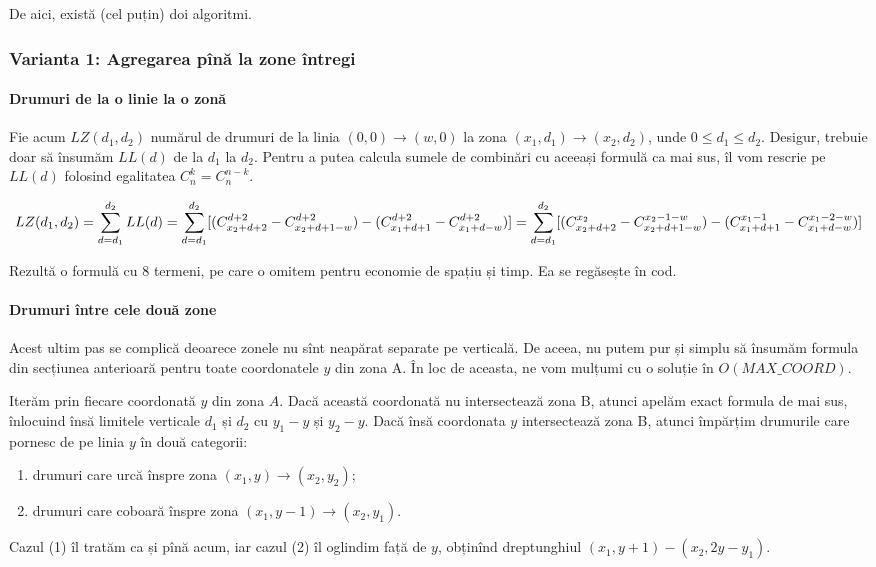 \documentclass[../main.tex]{subfiles}
\begin{document}
De aici, există (cel puțin) doi algoritmi.

\subsubsection*{Varianta 1: Agregarea pînă la zone întregi}

\paragraph*{Drumuri de la o linie la o zonă}

Fie acum $LZ(d_1, d_2)$ numărul de drumuri de la linia $(0,0) \to (w, 0)$ la zona $(x_1, d_1) \to (x_2, d_2)$, unde $0 \leq d_1 \leq d_2$. Desigur, trebuie doar să însumăm $LL(d)$ de la $d_1$ la $d_2$. Pentru a putea calcula sumele de combinări cu aceeași formulă ca mai sus, îl vom rescrie pe $LL(d)$ folosind egalitatea $C_n^k = C_n^{n-k}$.

$$
LZ(d_1, d_2) = \sum_{d = d_1}^{d_2} LL(d)\\
= \sum_{d = d_1}^{d_2} [(C_{x_2 + d + 2}^{d + 2} - C_{x_2 + d + 1 - w}^{d + 2}) - (C_{x_1 + d + 1}^{d + 2} - C_{x_1 + d - w}^{d + 2})]\\
= \sum_{d = d_1}^{d_2} [(C_{x_2 + d + 2}^{x_2} - C_{x_2 + d + 1 - w}^{x_2 - 1 - w}) - (C_{x_1 + d + 1}^{x_1 - 1} - C_{x_1 + d - w}^{x_1 - 2 - w})]\\
$$

Rezultă o formulă cu 8 termeni, pe care o omitem pentru economie de spațiu și timp. Ea se regăsește în cod.

\paragraph*{Drumuri între cele două zone}

Acest ultim pas se complică deoarece zonele nu sînt neapărat separate pe verticală. De aceea, nu putem pur și simplu să însumăm formula din secțiunea anterioară pentru toate coordonatele $y$ din zona A. În loc de aceasta, ne vom mulțumi cu o soluție în $O(MAX\_COORD)$.

Iterăm prin fiecare coordonată $y$ din zona $A$. Dacă această coordonată nu intersectează zona B, atunci apelăm exact formula de mai sus, înlocuind însă limitele verticale $d_1$ și $d_2$ cu $y_1 - y$ și $y_2 - y$. Dacă însă coordonata $y$ intersectează zona B, atunci împărțim drumurile care pornesc de pe linia $y$ în două categorii:

\begin{enumerate}
  \item drumuri care urcă înspre zona $(x_1, y) \to (x_2, y_2)$;
  \item drumuri care coboară înspre zona $(x_1, y-1) \to (x_2, y_1)$.
\end{enumerate}
Cazul (1) îl tratăm ca și pînă acum, iar cazul (2) îl oglindim față de $y$, obținînd dreptunghiul $(x_1, y+1) - (x_2, 2y - y_1)$.
\end{document}
